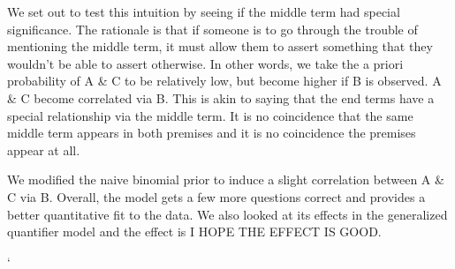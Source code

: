 \documentclass[10pt,letterpaper]{article}
\begin{document}
We set out to test this intuition by seeing if the middle term had special significance. The rationale is that if someone is to go through the trouble of mentioning the middle term, it must allow them to assert something that they wouldn't be able to assert otherwise. In other words, we take the a priori probability of A \& C to be relatively low, but become higher if B is observed. A \& C become correlated via B. This is akin to saying that the end terms have a special relationship via the middle term. It is no coincidence that the same middle term appears in both premises and it is no coincidence the premises appear at all. 

We modified the naive binomial prior to induce a slight correlation between A \& C via B. Overall, the model gets a few more questions correct and provides a better quantitative fit to the data. We also looked at its effects in the generalized quantifier model and the effect is I HOPE THE EFFECT IS GOOD. 



\setlength{\bibleftmargin}{.125in}`
\setlength{\bibindent}{-\bibleftmargin}


\end{document}
